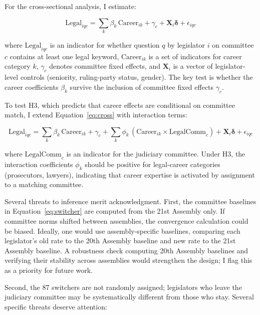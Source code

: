 \documentclass[11pt]{article}
\begin{document}
For the cross-sectional analysis, I estimate:

\begin{equation}
\text{Legal}_{iqc} = \sum_{k} \beta_k \, \text{Career}_{ik} + \gamma_c + \mathbf{X}_i \boldsymbol{\delta} + \epsilon_{iqc}
\label{eq:cross}
\end{equation}

\noindent where $\text{Legal}_{iqc}$ is an indicator for whether question $q$ by legislator $i$ on committee $c$ contains at least one legal keyword, $\text{Career}_{ik}$ is a set of indicators for career category $k$, $\gamma_c$ denotes committee fixed effects, and $\mathbf{X}_i$ is a vector of legislator-level controls (seniority, ruling-party status, gender). The key test is whether the career coefficients $\beta_k$ survive the inclusion of committee fixed effects $\gamma_c$.

To test H3, which predicts that career effects are conditional on committee match, I extend Equation~\ref{eq:cross} with interaction terms:

\begin{equation}
\text{Legal}_{iqc} = \sum_{k} \beta_k \, \text{Career}_{ik} + \gamma_c + \sum_{k} \phi_k \, (\text{Career}_{ik} \times \text{LegalComm}_{c}) + \mathbf{X}_i \boldsymbol{\delta} + \epsilon_{iqc}
\label{eq:interact}
\end{equation}

\noindent where $\text{LegalComm}_c$ is an indicator for the judiciary committee. Under H3, the interaction coefficients $\phi_k$ should be positive for legal-career categories (prosecutors, lawyers), indicating that career expertise is activated by assignment to a matching committee.

Several threats to inference merit acknowledgment. First, the committee baselines in Equation~\ref{eq:switcher} are computed from the 21st Assembly only. If committee norms shifted between assemblies, the convergence calculation could be biased. Ideally, one would use assembly-specific baselines, comparing each legislator's old rate to the 20th Assembly baseline and new rate to the 21st Assembly baseline. A robustness check computing 20th Assembly baselines and verifying their stability across assemblies would strengthen the design; I flag this as a priority for future work.

Second, the 87 switchers are not randomly assigned; legislators who leave the judiciary committee may be systematically different from those who stay. Several specific threats deserve attention:
\end{document}
